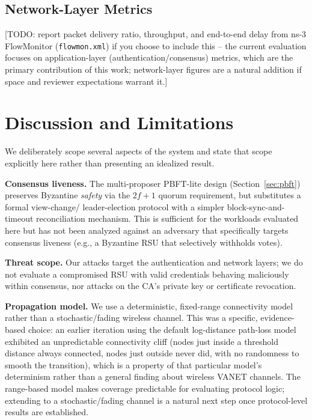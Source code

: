 \documentclass[conference]{IEEEtran}
\begin{document}
\subsection{Network-Layer Metrics}

[TODO: report packet delivery ratio, throughput, and end-to-end delay
from ns-3 FlowMonitor (\texttt{flowmon.xml}) if you choose to include
this -- the current evaluation focuses on application-layer
(authentication/consensus) metrics, which are the primary contribution
of this work; network-layer figures are a natural addition if space
and reviewer expectations warrant it.]

\section{Discussion and Limitations}
\label{sec:limitations}

We deliberately scope several aspects of the system and state that
scope explicitly here rather than presenting an idealized result.

\textbf{Consensus liveness.} The multi-proposer PBFT-lite design
(Section~\ref{sec:pbft}) preserves Byzantine \emph{safety} via the
$2f{+}1$ quorum requirement, but substitutes a formal view-change/
leader-election protocol with a simpler block-sync-and-timeout
reconciliation mechanism. This is sufficient for the workloads
evaluated here but has not been analyzed against an adversary that
specifically targets consensus liveness (e.g., a Byzantine RSU that
selectively withholds votes).

\textbf{Threat scope.} Our attacks target the authentication and
network layers; we do not evaluate a compromised RSU with valid
credentials behaving maliciously within consensus, nor attacks on the
CA's private key or certificate revocation.

\textbf{Propagation model.} We use a deterministic, fixed-range
connectivity model rather than a stochastic/fading wireless channel.
This was a specific, evidence-based choice: an earlier iteration
using the default log-distance path-loss model exhibited an
unpredictable connectivity cliff (nodes just inside a threshold
distance always connected, nodes just outside never did, with no
randomness to smooth the transition), which is a property of that
particular model's determinism rather than a general finding about
wireless VANET channels. The range-based model makes coverage
predictable for evaluating protocol logic; extending to a
stochastic/fading channel is a natural next step once protocol-level
results are established.
\end{document}
